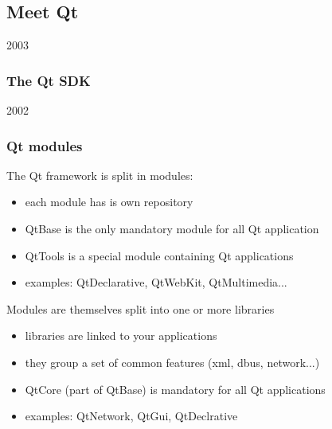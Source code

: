 %
%
%
%

\subsection{Meet Qt}

\begin{slide}{2003}\frametitle{The Qt SDK}
\vspace*{0.5em}

\end{slide}

\begin{slide}{2002}\frametitle{Qt modules}
\vspace*{1.5em}
The Qt framework is split in modules:
\begin{itemize}
\item each module has is own repository
\item QtBase is the only mandatory module for all Qt application
\item QtTools is a special module containing Qt applications
\item examples: QtDeclarative, QtWebKit, QtMultimedia...
\end{itemize}
Modules are themselves split into one or more libraries
\begin{itemize}
\item libraries are linked to your applications
\item they group a set of common features (xml, dbus, network...)
\item QtCore (part of QtBase) is mandatory for all Qt applications
\item examples: QtNetwork, QtGui, QtDeclrative
\end{itemize}

\end{slide}

